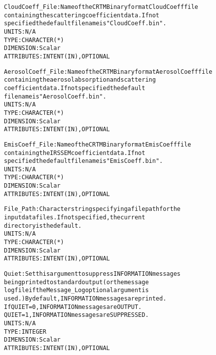 \begin{alltt}
        CloudCoeff_File:    Name of the CRTM Binary format CloudCoeff file
                            containing the scattering coefficient data. If not
                            specified the default filename is "CloudCoeff.bin".
                            UNITS:      N/A
                            TYPE:       CHARACTER(*)
                            DIMENSION:  Scalar
                            ATTRIBUTES: INTENT(IN), OPTIONAL
 
        AerosolCoeff_File:  Name of the CRTM Binary format AerosolCoeff file
                            containing the aerosol absorption and scattering
                            coefficient data. If not specified the default
                            filename is "AerosolCoeff.bin".
                            UNITS:      N/A
                            TYPE:       CHARACTER(*)
                            DIMENSION:  Scalar
                            ATTRIBUTES: INTENT(IN), OPTIONAL
 
        EmisCoeff_File:     Name of the CRTM Binary format EmisCoeff file
                            containing the IRSSEM coefficient data. If not
                            specified the default filename is "EmisCoeff.bin".
                            UNITS:      N/A
                            TYPE:       CHARACTER(*)
                            DIMENSION:  Scalar
                            ATTRIBUTES: INTENT(IN), OPTIONAL
 
        File_Path:          Character string specifying a file path for the
                            input data files. If not specified, the current
                            directory is the default.
                            UNITS:      N/A
                            TYPE:       CHARACTER(*)
                            DIMENSION:  Scalar
                            ATTRIBUTES: INTENT(IN), OPTIONAL
 
        Quiet:              Set this argument to suppress INFORMATION messages
                            being printed to standard output (or the message
                            log file if the Message_Log optional argument is
                            used.) By default, INFORMATION messages are printed.
                            If QUIET = 0, INFORMATION messages are OUTPUT.
                               QUIET = 1, INFORMATION messages are SUPPRESSED.
                            UNITS:      N/A
                            TYPE:       INTEGER
                            DIMENSION:  Scalar
                            ATTRIBUTES: INTENT(IN), OPTIONAL
 

\end{alltt}
